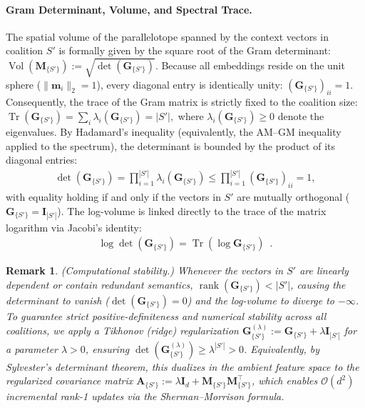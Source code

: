 \documentclass{article}
\newtheorem{remark}[theorem]{Remark}
\begin{document}
\paragraph{Gram Determinant, Volume, and Spectral Trace.}
The spatial volume of the parallelotope spanned by the context vectors in coalition $S'$ is formally given by the square root of the Gram determinant: $\operatorname{Vol}(\mathbf{M}_{\{S'\}}) := \sqrt{\det(\mathbf{G}_{\{S'\}})}$. Because all embeddings reside on the unit sphere ($\|\mathbf{m}_i\|_2 = 1$), every diagonal entry is identically unity: $(\mathbf{G}_{\{S'\}})_{ii} = 1$. Consequently, the trace of the Gram matrix is strictly fixed to the coalition size: 
$ \operatorname{Tr}(\mathbf{G}_{\{S'\}}) = \sum_{i} \lambda_i(\mathbf{G}_{\{S'\}}) = |S'|,$
where $\lambda_i(\mathbf{G}_{\{S'\}}) \ge 0$ denote the eigenvalues. By Hadamard's inequality (equivalently, the AM--GM inequality applied to the spectrum), the determinant is bounded by the product of its diagonal entries:
\begin{align}
    \det(\mathbf{G}_{\{S'\}}) = \prod_{i=1}^{|S'|} \lambda_i(\mathbf{G}_{\{S'\}}) \le \prod_{i=1}^{|S'|} (\mathbf{G}_{\{S'\}})_{ii} = 1,
\end{align}
with equality holding if and only if the vectors in $S'$ are mutually orthogonal ($\mathbf{G}_{\{S'\}} = \mathbf{I}_{|S'|}$). The log-volume is linked directly to the trace of the matrix logarithm via Jacobi's identity: 
\begin{align}
\log \det(\mathbf{G}_{\{S'\}}) = \operatorname{Tr}(\log \mathbf{G}_{\{S'\}})\enspace .
\end{align} 

\begin{remark}{(Computational stability.)} Whenever the vectors in $S'$ are linearly dependent or contain redundant semantics, $\operatorname{rank}(\mathbf{G}_{\{S'\}}) < |S'|$, causing the determinant to vanish ($\det(\mathbf{G}_{\{S'\}}) = 0$) and the log-volume to diverge to $-\infty$. To guarantee strict positive-definiteness and numerical stability across all coalitions, we apply a Tikhonov (ridge) regularization $\mathbf{G}_{\{S'\}}^{(\lambda)} := \mathbf{G}_{\{S'\}} + \lambda \mathbf{I}_{|S'|}$ for a parameter $\lambda > 0$, ensuring $\det(\mathbf{G}_{\{S'\}}^{(\lambda)}) \ge \lambda^{|S'|} > 0$. Equivalently, by Sylvester's determinant theorem, this dualizes in the ambient feature space to the regularized covariance matrix $\mathbf{A}_{\{S'\}} := \lambda \mathbf{I}_d + \mathbf{M}_{\{S'\}}\mathbf{M}_{\{S'\}}^\top$, which enables $\mathcal{O}(d^2)$ incremental rank-1 updates via the Sherman--Morrison formula.
\end{remark}
\end{document}
